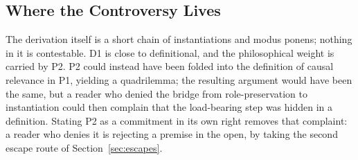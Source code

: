 \documentclass[11pt]{article}
\begin{document}
\subsection*{Where the Controversy Lives}

The derivation itself is a short chain of instantiations and modus ponens;
nothing in it is contestable. D1 is close to definitional, and the
philosophical weight is carried by P2. P2 could instead have been folded into
the definition of causal relevance in P1, yielding a quadrilemma; the
resulting argument would have been the same, but a reader who denied the
bridge from role-preservation to instantiation could then complain that the
load-bearing step was hidden in a definition. Stating P2 as a commitment in
its own right removes that complaint: a reader who denies it is rejecting a
premise in the open, by taking the second escape route of
Section~\ref{sec:escapes}.
\end{document}
